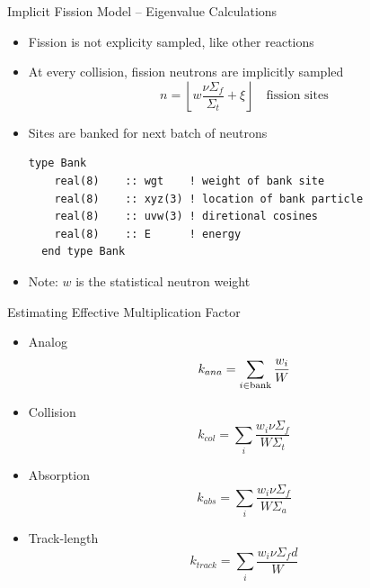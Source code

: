 \documentclass[serif]{beamer}
\begin{document}

\begin{frame}[fragile]{Implicit Fission Model -- Eigenvalue Calculations}

\begin{itemize}

  \item Fission is not explicity sampled, like other reactions\vfill
  \item At every collision, fission neutrons are implicitly sampled\vfill
  \begin{equation*}
     n = \left \lfloor w \frac{\nu\Sigma_f}{\Sigma_t} + \xi \right
     \rfloor \quad \text{fission sites}
  \end{equation*} \vfill
  \item Sites are banked for next batch of neutrons\vfill
  \begin{lstlisting}[language={[90]Fortran},frame=single,backgroundcolor=\color{gray!20},keywordstyle=\color{darkblue}]
  type Bank
    real(8)    :: wgt    ! weight of bank site
    real(8)    :: xyz(3) ! location of bank particle
    real(8)    :: uvw(3) ! diretional cosines
    real(8)    :: E      ! energy
  end type Bank
  \end{lstlisting} 
  \item \alert{Note:} $w$ is the statistical neutron weight
\end{itemize}

\end{frame}


\begin{frame}{Estimating Effective Multiplication Factor}

  \begin{itemize}

    \item Analog
\[
    k_{ana} = \sum_{i\in\rm{bank}}\frac{w_i}{W}
\]
    \item Collision
\[
    k_{col} = \sum_i\frac{w_i\nu\Sigma_{f}}{W\Sigma_{t}}
\]
    \item Absorption
\[
    k_{abs} = \sum_i\frac{w_i\nu\Sigma_{f}}{W\Sigma_{a}}
\]
    \item Track-length
\[
    k_{track} = \sum_i\frac{w_i\nu\Sigma_{f}d}{W}
\]
  \end{itemize}

\end{frame}
\end{document}
